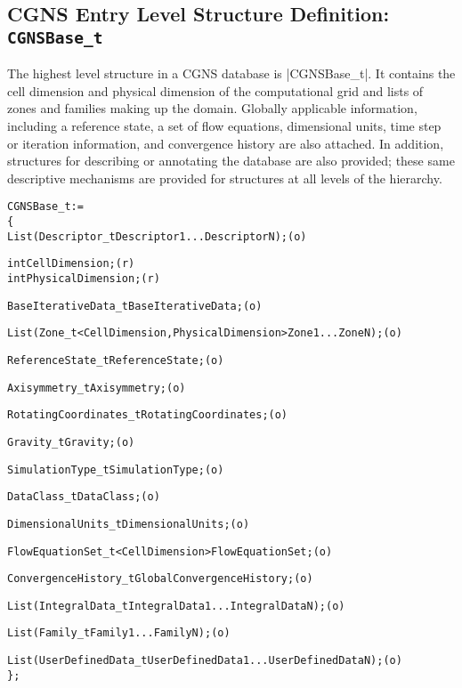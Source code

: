 \subsection{CGNS Entry Level Structure Definition: \texttt{CGNSBase\_t}}
\label{s:CGNSBase}

The highest level structure in a CGNS database is |CGNSBase_t|.
It contains the cell dimension and physical dimension of the
computational grid and lists of zones and families making up the domain.
Globally applicable information, including a reference state, a set of
flow equations, dimensional units, time step or iteration information,
and convergence history are also attached.
In addition, structures for describing or annotating the database are
also provided; these same descriptive mechanisms are provided for
structures at all levels of the hierarchy.
\begin{alltt}
  CGNSBase\_t :=
    \{
    List( Descriptor\_t Descriptor1 ... DescriptorN ) ;                      (o)

    int CellDimension ;                                                     (r)
    int PhysicalDimension ;                                                 (r)

    BaseIterativeData\_t BaseIterativeData ;                                 (o)

    List( Zone\_t<CellDimension, PhysicalDimension> Zone1 ... ZoneN ) ;      (o)

    ReferenceState\_t ReferenceState ;                                       (o)

    Axisymmetry\_t Axisymmetry ;                                             (o)

    RotatingCoordinates\_t RotatingCoordinates ;                             (o)

    Gravity\_t Gravity ;                                                     (o)

    SimulationType\_t SimulationType ;                                       (o)

    DataClass\_t DataClass ;                                                 (o)

    DimensionalUnits\_t DimensionalUnits ;                                   (o)

    FlowEquationSet\_t<CellDimension> FlowEquationSet ;                      (o)

    ConvergenceHistory\_t GlobalConvergenceHistory ;                         (o)

    List( IntegralData\_t IntegralData1... IntegralDataN ) ;                 (o)

    List( Family\_t Family1... FamilyN ) ;                                   (o)

    List( UserDefinedData\_t UserDefinedData1 ... UserDefinedDataN ) ;       (o)
    \} ;
\end{alltt}

